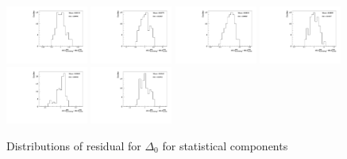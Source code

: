 \begin{figure}[h]
    \includegraphics[width=0.24\textwidth]{figure/polarimetery/syst/bootstrap/output_stat_4740_delta0.pdf}
    \includegraphics[width=0.24\textwidth]{figure/polarimetery/syst/bootstrap/output_stat_4750_delta0.pdf}
    \includegraphics[width=0.24\textwidth]{figure/polarimetery/syst/bootstrap/output_stat_4780_delta0.pdf}
    \includegraphics[width=0.24\textwidth]{figure/polarimetery/syst/bootstrap/output_stat_4840_delta0.pdf}
    \includegraphics[width=0.24\textwidth]{figure/polarimetery/syst/bootstrap/output_stat_4920_delta0.pdf}
    \includegraphics[width=0.24\textwidth]{figure/polarimetery/syst/bootstrap/output_stat_4950_delta0.pdf}
    \caption{Distributions of residual for $\Delta_0$ for statistical components}
\label{fig:angular_stat_delta0}
\end{figure}

